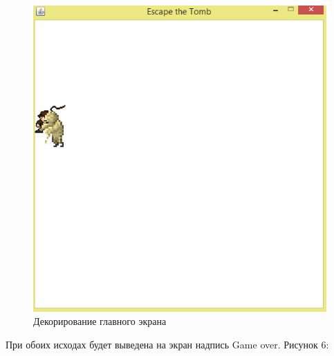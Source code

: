 \begin{figure}[H]
	\begin{center}
		\includegraphics[scale=0.7]{image/field4.png}
		\caption{Декорирование главного экрана} 
		\label{pic:pic_name} %
	\end{center}
\end{figure}

При обоих исходах будет выведена на экран надпись Game over. Рисунок 6:

